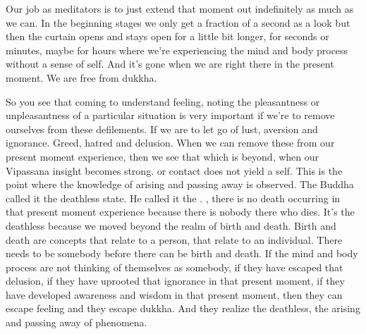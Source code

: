 \documentclass[letterpaper,10pt,english]{sphinxmanual}
\begin{document}
\sphinxAtStartPar
Our job as meditators is to just extend that moment out indefinitely as
much as we can. In the beginning stages we only get a fraction of a second
as a look but then the curtain opens and stays open for a little bit longer, for
seconds or minutes, maybe for hours where we’re experiencing the mind and
body process without a sense of self. And it’s gone when we are right there
in the present moment. We are free from dukkha.

\sphinxAtStartPar
{}

\sphinxAtStartPar
{}

\sphinxAtStartPar
{}

\sphinxAtStartPar
{}

\sphinxAtStartPar
So  you  see  that  coming  to  understand  feeling,  noting  the  pleasantness or unpleasantness of a particular situation is very important if we’re to
remove ourselves from these defilements. If we are to let go of lust, aversion
and ignorance. Greed, hatred and delusion. When we can remove these from
our  present  moment  experience,  then  we  see  that  which  is  beyond,  when
our Vipassana  insight  becomes  strong.
or  contact  does  not  yield  a
self. This is the point where the knowledge of arising and passing away is
observed. The Buddha called it the deathless state. He called it the
.
, there is no death occurring in that present moment experience
because there is nobody there who dies. It’s the deathless because we moved
beyond the realm of birth and death. Birth and death are concepts that relate
to a person, that relate to an individual. There needs to be somebody before
there  can  be  birth  and  death.  If  the  mind  and  body  process  are  not  thinking of themselves as somebody, if they have escaped that delusion, if they
have uprooted that ignorance in that present moment, if they have developed
awareness and wisdom in that present moment, then they can escape feeling
and they escape dukkha. And they realize the deathless, the arising and passing away of phenomena.
\end{document}
